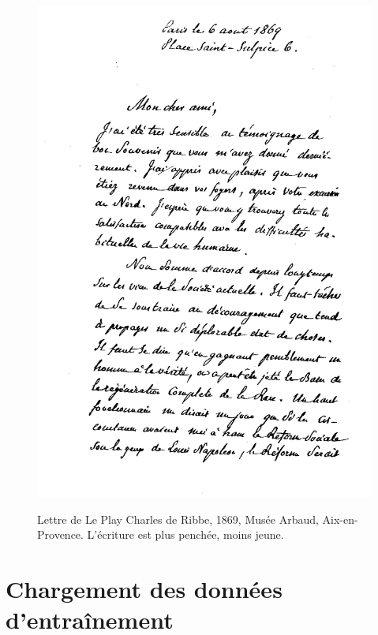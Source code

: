 \begin{figure}[H]
    \centering
    \caption{Lettre de Le Play Charles de Ribbe, 1869, Musée Arbaud, Aix-en-Provence. L'écriture est plus penchée, moins jeune.}
    \includegraphics[width=16cm]{images/ribbe.png}
    \label{ribbe}
\end{figure}

\hugeskip 

\section{Chargement des données d'entraînement}

